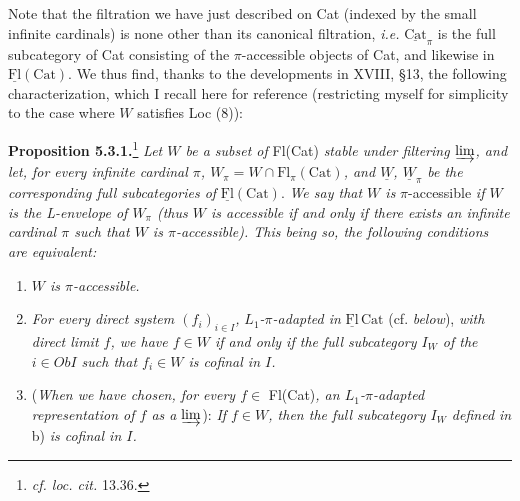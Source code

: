 \documentclass[11pt]{article}
\newcommand{\printedpage}[1]{\marginpar{\footnotesize p.~#1}}
\newcommand{\msp}[1]{\marginpar{\footnotesize [#1]}}
\newcommand{\uFl}{\underline{\mathrm{Fl}}}
\newcommand{\uCat}{\underline{\mathrm{Cat}}}
\begin{document}
\msp{page 76}
Note that the filtration we have just described on Cat (indexed by the small infinite cardinals) is none other than its canonical filtration, \textit{i.e.} $\uCat_\pi$ is the full subcategory of Cat consisting of the $\pi$-accessible objects of Cat, and likewise in $\uFl(\mathrm{Cat})$. We thus find, thanks to the developments in XVIII, §13, the following characterization, which I recall here for reference (restricting myself for simplicity to the case where $W$ satisfies Loc (8)):

\textbf{Proposition 5.3.1.}\footnote[38]{\textit{cf. loc. cit.} 13.36.} \textit{Let $W$ be a subset of} Fl(Cat) \textit{stable under filtering $\varinjlim$, and let, for every infinite cardinal $\pi$, $W_\pi = W \cap \mathrm{Fl}_\pi(\mathrm{Cat})$, and $\underline{W}$, $\underline{W}_\pi$ be the corresponding full subcategories of} $\uFl(\mathrm{Cat})$. \textit{We say that $W$ is} $\pi$-accessible \textit{if $W$ is the L-envelope of $W_\pi$ (thus $W$ is accessible if and only if there exists an infinite cardinal $\pi$ such that $W$ is $\pi$-accessible). This being so, the following conditions are equivalent:}

\printedpage{42}

\begin{enumerate}[label={}]
\item[a)] \textit{$W$ is $\pi$-accessible.}
\item[b)] \textit{For every direct system $(f_i)_{i\in I}$,}
\msp{page 77}
\textit{$L_1$-$\pi$-adapted in} $\uFl\,\mathrm{Cat}$ (cf. \textit{below}), \textit{with direct limit $f$, we have $f \in W$ if and only if the full subcategory $I_W$ of the $i \in \mathit{Ob}I$ such that $f_i \in W$ is cofinal in $I$.}
\item[b$'$)] (\textit{When we have chosen, for every $f \in$} Fl(Cat)\textit{, an $L_1$-$\pi$-adapted representation of $f$ as a $\varinjlim$}): \textit{If $f \in W$, then the full subcategory $I_W$ defined in} b) \textit{is cofinal in $I$.}
\end{enumerate}
\end{document}

